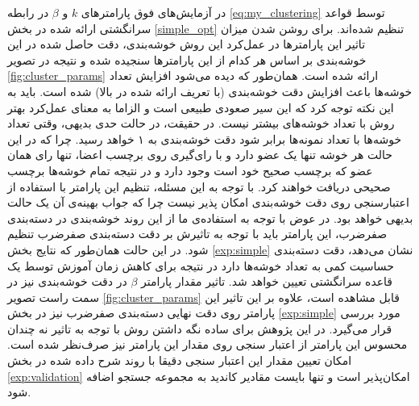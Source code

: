  در آزمایش‌های فوق پارامترهای $k$ و $\beta$ در رابطه \eqref{eq:my_clustering} توسط قواعد سرانگشتی ارائه شده در بخش \ref{simple_opt} تنظیم شده‌اند. برای روشن شدن میزان تاثیر این پارامترها در عمل‌کرد این روش خوشه‌بندی، دقت حاصل شده در این خوشه‌بندی بر اساس هر کدام از این پارامترها سنجیده شده و نتیجه در تصویر \ref{fig:cluster_params} ارائه شده است.
 همان‌طور که دیده می‌شود افزایش تعداد خوشه‌ها باعث افزایش دقت خوشه‌بندی  (با تعریف ارائه شده در بالا) شده است. باید به این نکته توجه کرد که این سیر صعودی طبیعی است و الزاما به معنای عمل‌کرد بهتر روش با تعداد خوشه‌های بیشتر نیست. در حقیقت، در حالت حدی بدیهی، وقتی تعداد خوشه‌ها با تعداد نمونه‌ها برابر شود دقت خوشه‌بندی به ۱ خواهد رسید. چرا که در این حالت هر خوشه تنها یک عضو دارد و با رای‌گیری روی برچسب اعضا، تنها رای همان عضو که برچسب صحیح خود است وجود دارد و در نتیجه تمام خوشه‌ها برچسب صحیحی دریافت خواهند کرد. با توجه به این مسئله، تنظیم این پارامتر با استفاده از اعتبارسنجی روی دقت خوشه‌بندی امکان پذیر نیست چرا که جواب بهینه‌ی آن یک حالت بدیهی خواهد بود. در عوض با توجه به استفاده‌ی ما از این روند خوشه‌بندی در دسته‌بندی صفرضرب، این پارامتر باید با توجه به تاثیرش بر دقت دسته‌بندی صفرضرب تنظیم شود. در این حالت همان‌طور که نتایج بخش \ref{exp:simple} نشان می‌دهد، دقت دسته‌بندی حساسیت کمی به تعداد خوشه‌ها دارد در نتیجه برای کاهش زمان آموزش توسط یک قاعده سرانگشتی تعیین خواهد شد.
 تاثیر مقدار پارامتر $\beta$ در دقت خوشه‌بندی نیز در  سمت راست تصویر \ref{fig:cluster_params} قابل مشاهده است، علاوه بر این تاثیر این پارامتر روی دقت نهایی دسته‌بندی صفرضرب نیز در بخش \ref{exp:simple} مورد بررسی قرار می‌گیرد. در این پژوهش برای ساده نگه داشتن روش با توجه به تاثیر نه چندان محسوس این پارامتر از اعتبار سنجی روی مقدار این پارامتر نیز صرف‌نظر شده است. امکان تعیین مقدار این اعتبار سنجی دقیقا با روند شرح داده شده در بخش \ref{exp:validation} امکان‌پذیر است و تنها بایست مقادیر کاندید به مجموعه جستجو اضافه شود.
